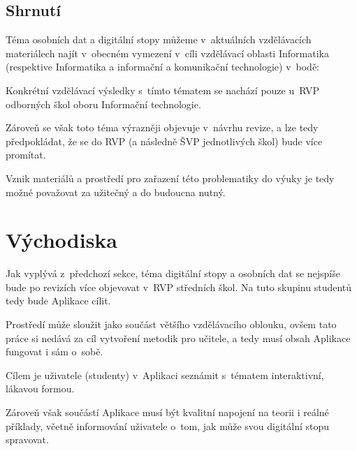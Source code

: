\subsection*{Shrnutí}

Téma osobních dat a digitální stopy můžeme v~aktuálních vzdělávacích materiálech najít v~obecném vymezení v~cíli vzdělávací oblasti Informatika (respektive Informatika a informační a komunikační technologie) v~bodě:

\begin{displayquote}
	\citep{rvp-g}
\end{displayquote}

Konkrétní vzdělávací výsledky s~tímto tématem se nachází pouze u~RVP odborných škol oboru Informační technologie.

Zároveň se však toto téma výrazněji objevuje v~návrhu revize, a lze tedy předpokládat, že se do RVP (a následně ŠVP jednotlivých škol) bude více promítat.

Vznik materiálů a prostředí pro zařazení této problematiky do výuky je tedy možné považovat za užitečný a do budoucna nutný.



\section{Východiska}
Jak vyplývá z~předchozí sekce, téma digitální stopy a osobních dat se nejspíše bude po revizích více objevovat v~RVP středních škol. Na tuto skupinu studentů tedy bude Aplikace cílit.

Prostředí může sloužit jako součást většího vzdělávacího oblouku, ovšem tato práce si nedává za cíl vytvoření metodik pro učitele, a tedy musí obsah Aplikace fungovat i sám o~sobě.

Cílem je uživatele (studenty) v~Aplikaci seznámit s~tématem interaktivní, lákavou formou.

Zároveň však součástí Aplikace musí být kvalitní napojení na teorii i reálné příklady, včetně informování uživatele o~tom, jak může svou digitální stopu spravovat.

